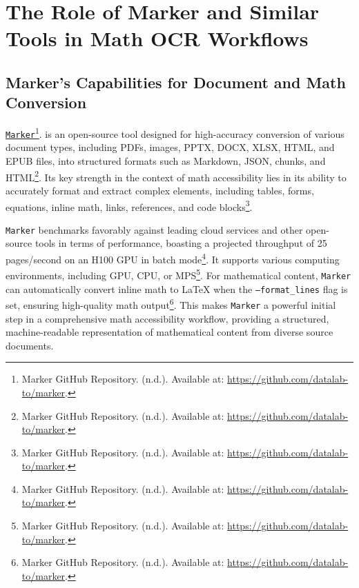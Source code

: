\section{The Role of Marker and Similar Tools in Math OCR Workflows}\label{sec:marker-tools}
\subsection{Marker's Capabilities for Document and Math Conversion}
\href{https://github.com/datalab-to/marker}{\texttt{Marker}}\footnote{Marker GitHub Repository. (n.d.). Available at: \url{https://github.com/datalab-to/marker}.}. is an open-source tool designed for high-accuracy conversion of various document types, including PDFs, images, PPTX, DOCX, XLSX, HTML, and EPUB files, into structured formats such as Markdown, JSON, chunks, and HTML\footnote{Marker GitHub Repository. (n.d.). Available at: \url{https://github.com/datalab-to/marker}.}. Its key strength in the context of math accessibility lies in its ability to accurately format and extract complex elements, including tables, forms, equations, inline math, links, references, and code blocks\footnote{Marker GitHub Repository. (n.d.). Available at: \url{https://github.com/datalab-to/marker}.}.

\texttt{Marker} benchmarks favorably against leading cloud services and other open-source tools in terms of performance, boasting a projected throughput of 25 pages/second on an H100 GPU in batch mode\footnote{Marker GitHub Repository. (n.d.). Available at: \url{https://github.com/datalab-to/marker}.}. It supports various computing environments, including GPU, CPU, or MPS\footnote{Marker GitHub Repository. (n.d.). Available at: \url{https://github.com/datalab-to/marker}.}. For mathematical content, \texttt{Marker} can automatically convert inline math to LaTeX when the \texttt{--format\_lines} flag is set, ensuring high-quality math output\footnote{Marker GitHub Repository. (n.d.). Available at: \url{https://github.com/datalab-to/marker}.}. This makes \texttt{Marker} a powerful initial step in a comprehensive math accessibility workflow, providing a structured, machine-readable representation of mathematical content from diverse source documents.

